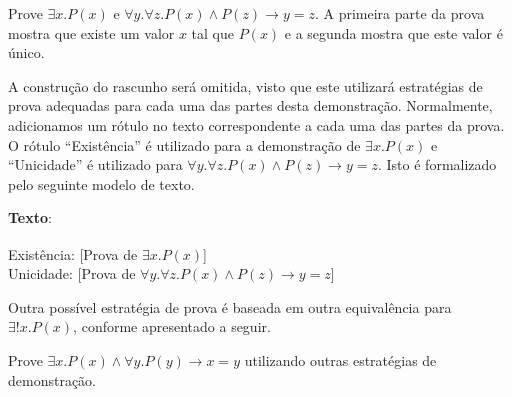 \begin{ProofStrategy}
Prove $\exists x. P(x)$ e $\forall y.\forall z. P(x) \land P(z) \to y
= z$. A primeira parte da prova mostra que existe um valor $x$ tal que
$P(x)$ e a segunda mostra que este valor é único.

A construção do rascunho será omitida, visto que este utilizará
estratégias de prova adequadas para cada uma das partes desta
demonstração. Normalmente,  adicionamos um
rótulo no texto correspondente a cada uma das partes da prova. O rótulo ``Existência'' é utilizado para
a demonstração de $\exists x. P(x)$ e ``Unicidade'' é utilizado para
$\forall y.\forall z. P(x) \land P(z) \to y = z$. Isto é formalizado
pelo seguinte modelo de texto.
\begin{flushleft}
\textbf{Texto}:\\
\verb| |\\
Existência: [Prova de $\exists x.P(x)$]\\
Unicidade: [Prova de $\forall y.\forall z. P(x) \land P(z) \to y = z$]\\
\end{flushleft}
\end{ProofStrategy}

Outra possível estratégia de prova é baseada em outra equivalência
para $\exists ! x. P(x)$, conforme apresentado a seguir.

\begin{ProofStrategy}
Prove $\exists x.P(x) \land \forall y. P(y) \to x = y$ utilizando
outras estratégias de demonstração.
\end{ProofStrategy}

